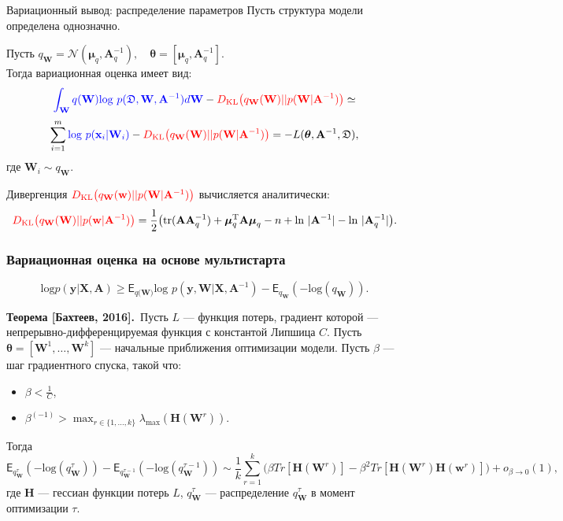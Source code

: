 \documentclass[usenames,dvipsnames,11pt,pdf,utf8,russian,aspectratio=169]{beamer}
\begin{document}
\begin{frame}{Вариационный вывод: распределение параметров}
Пусть структура модели определена однозначно.

Пусть $q_\mathbf{W} = \mathcal{N}(\boldsymbol{\mu}_q, \mathbf{A}^{-1}_q), \quad \boldsymbol{\theta} =  [\boldsymbol{\mu}_q, \mathbf{A}^{-1}_q].$ \\
Тогда вариационная оценка имеет вид:
$$
\textcolor{blue}{\int_{\mathbf{W}} q(\mathbf{W})\text{log}~{p(\mathfrak{D},\mathbf{W},\mathbf{A}^{-1})} d \mathbf{W}} - \textcolor{red}{D_\text{KL}\bigl(q_\mathbf{W} (\mathbf{W} )|| p (\mathbf{W}|\mathbf{A}^{-1})\bigr)} \simeq
$$
$$
\sum_{i=1}^m \textcolor{blue}{\text{log}~p(\mathbf{x}_i | \mathbf{W}_i)} - \textcolor{red}{D_\text{KL}\bigl(q_\mathbf{W} (\mathbf{W} )|| p (\mathbf{W}|\mathbf{A}^{-1})\bigr)} = -L(\boldsymbol{\theta}, \mathbf{A}^{-1}, \mathfrak{D}),
$$
где $\mathbf{W}_i \sim q_\mathbf{W}$.

Дивергенция $\textcolor{red}{D_\text{KL}\bigl(q_\mathbf{W} (\mathbf{w} )|| p (\mathbf{W}|\mathbf{A}^{-1})\bigr)}$ вычисляется аналитически:
$$
\textcolor{red}{D_\text{KL}\bigl(q_\mathbf{W} (\mathbf{W}) || p (\mathbf{w}|\mathbf{A}^{-1})\bigr)} = \frac{1}{2} \bigl( \text{tr} (\mathbf{A}\mathbf{A}^{-1}_q) + \boldsymbol{\mu}_q^\text{T}\mathbf{A}\boldsymbol{\mu}_q - n +\text{ln}~|\mathbf{A}^{-1}| - \text{ln}~|\mathbf{A}^{-1}_q| \bigr).
$$

\end{frame}

\begin{frame}
\frametitle{Вариационная оценка на основе мультистарта}
$$\text{log}p(\mathbf{y}|\mathbf{X}, \mathbf{A}) \geq \mathsf{E}_{q(\mathbf{W)}}\text{log~}p (\mathbf{y}, \mathbf{W}|\mathbf{X}, \mathbf{A}^{-1}) - \mathsf{E}_{q_{\mathbf{W}}}(-\text{log}(q_\mathbf{W})).$$

\textbf{Теорема [Бахтеев, 2016].}~Пусть $L$ --- функция потерь, градиент которой ---  непрерывно-дифференцируемая функция с константой Липшица $C$. Пусть $\boldsymbol{\theta} = [\mathbf{W}^1,\dots,\mathbf{W}^k]$ ---  начальные приближения оптимизации модели. Пусть $\beta$ --- шаг градиентного спуска, такой что:
\begin{itemize}
\item $\beta<\frac{1}{C}$,
\item $\beta^{(-1)} > \max_{r \in \{1,\dots,k\}}\lambda_\text{max} (\mathbf{H}(\mathbf{W}^r))$.
\end{itemize}
Тогда
\small
\[
	\mathsf{E}_{q^{\tau}_{\mathbf{W}}}(-\text{log}(q^{\tau}_\mathbf{W})) -  \mathsf{E}_{q^{\tau-1}_{\mathbf{W}}}(-\text{log}(q^{\tau-1}_\mathbf{W}))  \sim  \frac{1}{k}\sum_{r=1}^k \bigl(\beta Tr[\mathbf{H}(\mathbf{W}^r)] - \beta^2 Tr[\mathbf{H}(\mathbf{W}^r)\mathbf{H}(\mathbf{w}^r)]  \bigr) + o_{\beta \to 0}(1),
\]
где $\mathbf{H}$ --- гессиан функции потерь $L$, $q^{\tau}_\mathbf{W}$ --- распределение $q^{\tau}_\mathbf{W}$ в момент оптимизации $\tau$.
\end{frame}
\end{document}
